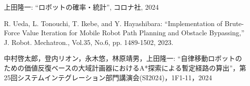 \documentclass[twocolumn,9pt]{jsproceedings}
\begin{document}
\begin{thebibliography}{99}
    上田隆一: ``ロボットの確率・統計'', コロナ社, 2024

  R. Ueda, L. Tonouchi, T. Ikebe, and Y. Hayashibara: ``Implementation of Brute-Force Value Iteration for Mobile Robot Path Planning and Obstacle Bypassing,''
  J. Robot. Mechatron., Vol.35, No.6, pp. 1489-1502, 2023.

    中村啓太郎，登内リオン，永木悠，林原靖男，上田隆一: ``自律移動ロボットのための価値反復ベースの大域計画器におけるA*探索による暫定経路の算出''，第25回システムインテグレーション部門講演会(SI2024)，1F1-11，2024











\end{thebibliography}
\end{document}

